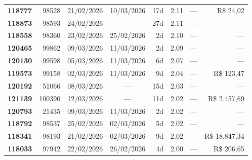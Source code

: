 \documentclass[a4paper,10pt]{article}
\begin{document}
\begin{center}
\begin{longtable}{>{\scriptsize}r>{\scriptsize}r>{\scriptsize}c>{\scriptsize}c>{\scriptsize}r>{\scriptsize}r>{\scriptsize}r>{\scriptsize}r}
\textcolor{anomyellow}{\textbf{118777}} & 98528 & 21/02/2026 & 10/03/2026 & 17d & \textcolor{anomyellow}{2.11} & --- & \textcolor{anomred}{R\$ 24,02} \\

\textcolor{anomyellow}{\textbf{118873}} & 98593 & 24/02/2026 & — & 27d & \textcolor{anomyellow}{2.11} & --- & --- \\

\textcolor{anomyellow}{\textbf{118558}} & 98360 & 23/02/2026 & 25/02/2026 & 2d & \textcolor{anomyellow}{2.10} & --- & --- \\

\textcolor{anomyellow}{\textbf{120465}} & 99862 & 09/03/2026 & 11/03/2026 & 2d & \textcolor{anomyellow}{2.09} & --- & --- \\

\textcolor{anomyellow}{\textbf{120130}} & 99598 & 05/03/2026 & 11/03/2026 & 6d & \textcolor{anomyellow}{2.07} & --- & --- \\

\textcolor{anomyellow}{\textbf{119573}} & 99158 & 02/03/2026 & 11/03/2026 & 9d & \textcolor{anomyellow}{2.04} & --- & \textcolor{anomred}{R\$ 123,47} \\

\textcolor{anomyellow}{\textbf{120192}} & 51066 & 08/03/2026 & — & 15d & \textcolor{anomyellow}{2.03} & --- & --- \\

\textcolor{anomyellow}{\textbf{121139}} & 100390 & 12/03/2026 & — & 11d & \textcolor{anomyellow}{2.02} & --- & \textcolor{anomred}{R\$ 2.457,69} \\

\textcolor{anomyellow}{\textbf{120793}} & 21435 & 09/03/2026 & 11/03/2026 & 2d & \textcolor{anomyellow}{2.02} & --- & --- \\

\textcolor{anomyellow}{\textbf{118792}} & 98537 & 25/02/2026 & 02/03/2026 & 5d & \textcolor{anomyellow}{2.02} & --- & --- \\

\textcolor{anomyellow}{\textbf{118341}} & 98193 & 21/02/2026 & 02/03/2026 & 9d & \textcolor{anomyellow}{2.02} & --- & \textcolor{anomred}{R\$ 18.847,34} \\

\textcolor{anomyellow}{\textbf{118033}} & 97942 & 22/02/2026 & 26/02/2026 & 4d & \textcolor{anomyellow}{2.00} & --- & \textcolor{anomred}{R\$ 206,65} \\

\end{longtable}\end{center}
\end{document}
